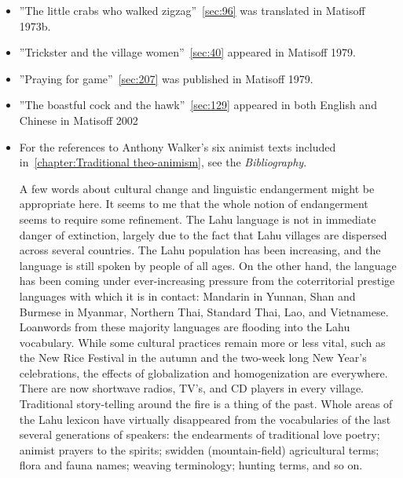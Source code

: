 \begin{itemize}
\item ''The little crabs who walked zigzag''~\ref{sec:96} was
  translated in Matisoff 1973b.

\item ''Trickster and the village women''~\ref{sec:40} appeared in
  Matisoff 1979.

\item ''Praying for game''~\ref{sec:207} was published in Matisoff
  1979.

\item ''The boastful cock and the hawk''~\ref{sec:129} appeared in
  both English and Chinese in Matisoff 2002

\item For the references to Anthony Walker's six animist texts
  included in~\ref{chapter:Traditional theo-animism}, see the
  \emph{Bibliography}.

A few words about cultural change and linguistic endangerment might be
appropriate here. It seems to me that the whole notion of endangerment
seems to require some refinement. The Lahu language is not in immediate
danger of extinction, largely due to the fact that Lahu villages are
dispersed across several countries. The Lahu population has been
increasing, and the language is still spoken by people of all ages. On
the other hand, the language has been coming under ever-increasing
pressure from the coterritorial prestige languages with which it is in
contact: Mandarin in Yunnan, Shan and Burmese in Myanmar, Northern Thai,
Standard Thai, Lao, and Vietnamese. Loanwords from these majority
languages are flooding into the Lahu vocabulary. While some cultural
practices remain more or less vital, such as the New Rice Festival in
the autumn and the two-week long New Year's celebrations, the effects of
globalization and homogenization are everywhere. There are now shortwave
radios, TV's, and CD players in every village. Traditional story-telling
around the fire is a thing of the past. Whole areas of the Lahu lexicon
have virtually disappeared from the vocabularies of the last several
generations of speakers: the endearments of traditional love poetry;
animist prayers to the spirits; swidden (mountain-field) agricultural
terms; flora and fauna names; weaving terminology; hunting terms, and so
on.


\end{itemize}
